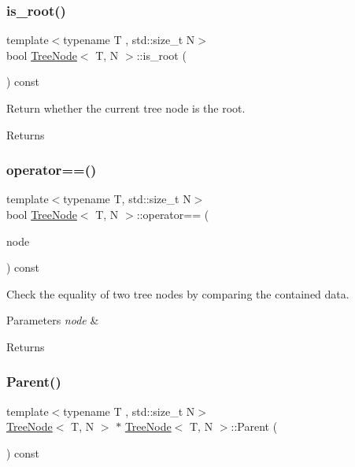 \subsubsection{\texorpdfstring{is\+\_\+root()}{is\_root()}}
{\footnotesize\ttfamily template$<$typename T , std\+::size\+\_\+t N$>$ \\
bool \hyperlink{classTreeNode}{Tree\+Node}$<$ T, N $>$\+::is\+\_\+root (\begin{DoxyParamCaption}{ }\end{DoxyParamCaption}) const}

Return whether the current tree node is the root. \begin{DoxyReturn}{Returns}

\end{DoxyReturn}
\mbox{\label{classTreeNode_a9446085d81c4266ca30a384001f55b12}} 
\subsubsection{\texorpdfstring{operator==()}{operator==()}}
{\footnotesize\ttfamily template$<$typename T, std\+::size\+\_\+t N$>$ \\
bool \hyperlink{classTreeNode}{Tree\+Node}$<$ T, N $>$\+::operator== (\begin{DoxyParamCaption}\item[{const \hyperlink{classTreeNode}{Tree\+Node}$<$ T, N $>$ \&}]{node }\end{DoxyParamCaption}) const}

Check the equality of two tree nodes by comparing the contained data. 
\begin{DoxyParams}{Parameters}
{\em node} & \\
\hline
\end{DoxyParams}
\begin{DoxyReturn}{Returns}

\end{DoxyReturn}
\mbox{\label{classTreeNode_a66c83bfefdb235d5cb4a299eb5044465}} 
\subsubsection{\texorpdfstring{Parent()}{Parent()}\hspace{0.1cm}{\footnotesize\ttfamily [1/2]}}
{\footnotesize\ttfamily template$<$typename T , std\+::size\+\_\+t N$>$ \\
\hyperlink{classTreeNode}{Tree\+Node}$<$ T, N $>$ $\ast$ \hyperlink{classTreeNode}{Tree\+Node}$<$ T, N $>$\+::Parent (\begin{DoxyParamCaption}\item[{void}]{ }\end{DoxyParamCaption}) const}

